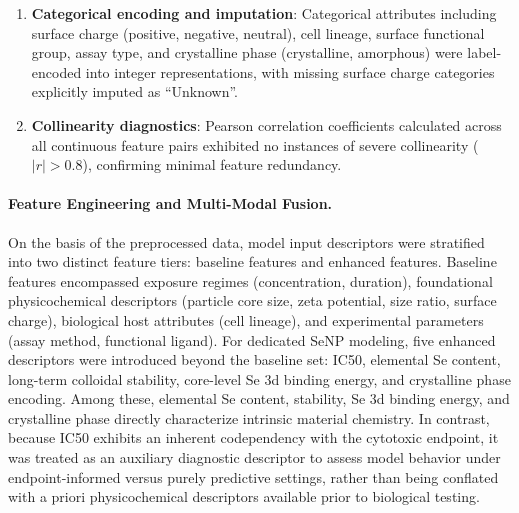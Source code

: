 \documentclass[letterpaper]{article}
\begin{document}
\begin{enumerate}
  \item \textbf{Categorical encoding and imputation}: Categorical attributes including surface charge (positive, negative, neutral), cell lineage, surface functional group, assay type, and crystalline phase (crystalline, amorphous) were label-encoded into integer representations, with missing surface charge categories explicitly imputed as ``Unknown''.

  \item \textbf{Collinearity diagnostics}: Pearson correlation coefficients calculated across all continuous feature pairs exhibited no instances of severe collinearity ($|r| > 0.8$), confirming minimal feature redundancy.
\end{enumerate}

\paragraph{Feature Engineering and Multi-Modal Fusion.}
On the basis of the preprocessed data, model input descriptors were stratified into two distinct feature tiers: baseline features and enhanced features. Baseline features encompassed exposure regimes (concentration, duration), foundational physicochemical descriptors (particle core size, zeta potential, size ratio, surface charge), biological host attributes (cell lineage), and experimental parameters (assay method, functional ligand). For dedicated SeNP modeling, five enhanced descriptors were introduced beyond the baseline set: IC50, elemental Se content, long-term colloidal stability, core-level Se 3d binding energy, and crystalline phase encoding. Among these, elemental Se content, stability, Se 3d binding energy, and crystalline phase directly characterize intrinsic material chemistry. In contrast, because IC50 exhibits an inherent codependency with the cytotoxic endpoint, it was treated as an auxiliary diagnostic descriptor to assess model behavior under endpoint-informed versus purely predictive settings, rather than being conflated with a priori physicochemical descriptors available prior to biological testing.
\end{document}
